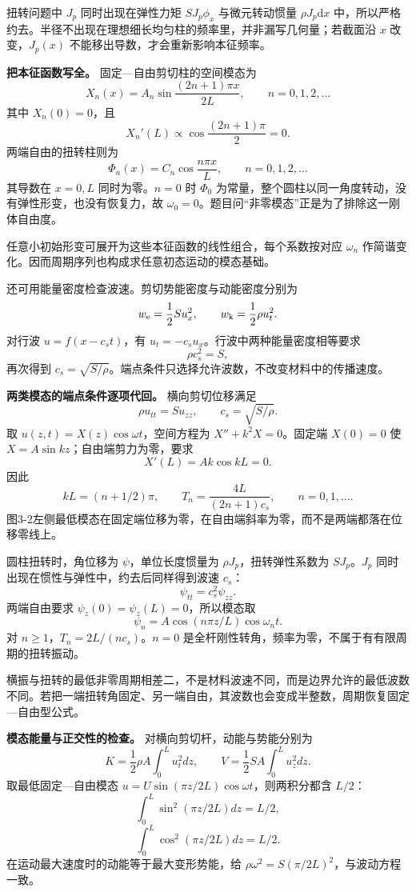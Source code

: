 \documentclass[12pt,a4paper,UTF8]{ctexart}
\begin{document}
扭转问题中 \(J_p\) 同时出现在弹性力矩 \(SJ_p\phi_x\) 与微元转动惯量
\(\rho J_p\mathrm dx\)
中，所以严格约去。半径不出现在理想细长均匀柱的频率里，并非漏写几何量；若截面沿
\(x\) 改变，\(J_p(x)\) 不能移出导数，才会重新影响本征频率。

\textbf{把本征函数写全。} 固定---自由剪切柱的空间模态为 \[
X_n(x)=A_n\sin\frac{(2n+1)\pi x}{2L},
\qquad n=0,1,2,\ldots
\] 其中 \(X_n(0)=0\)，且 \[
X_n'(L)\propto
\cos\frac{(2n+1)\pi}{2}=0.
\] 两端自由的扭转柱则为 \[
\Phi_n(x)=C_n\cos\frac{n\pi x}{L},
\qquad n=0,1,2,\ldots
\] 其导数在 \(x=0,L\) 同时为零。\(n=0\) 时 \(\Phi_0\)
为常量，整个圆柱以同一角度转动，没有弹性形变，也没有恢复力，故
\(\omega_0=0\)。题目问``非零模态''正是为了排除这一刚体自由度。

任意小初始形变可展开为这些本征函数的线性组合，每个系数按对应
\(\omega_n\) 作简谐变化。因而周期序列也构成求任意初态运动的模态基础。

还可用能量密度检查波速。剪切势能密度与动能密度分别为 \[
w_{\rm e}=\frac12S u_x^2,\qquad
w_{\rm k}=\frac12\rho u_t^2.
\] 对行波 \(u=f(x-c_st)\)，有
\(u_t=-c_su_x\)。行波中两种能量密度相等要求 \[
\rho c_s^2=S,
\] 再次得到
\(c_s=\sqrt{S/\rho}\)。端点条件只选择允许波数，不改变材料中的传播速度。

\textbf{两类模态的端点条件逐项代回。} 横向剪切位移满足 \[
\rho u_{tt}=S u_{zz},\qquad c_s=\sqrt{S/\rho}.
\] 取 \(u(z,t)=X(z)\cos\omega t\)，空间方程为 \(X''+k^2X=0\)。固定端
\(X(0)=0\) 使 \(X=A\sin kz\)；自由端剪力为零，要求 \[
X'(L)=Ak\cos kL=0.
\] 因此 \[
kL=(n+1/2)\pi,\qquad
T_n=\frac{4L}{(2n+1)c_s},\qquad n=0,1,\ldots.
\]
图3-2左侧最低模态在固定端位移为零，在自由端斜率为零，而不是两端都落在位移零线上。

圆柱扭转时，角位移为 \(\psi\)，单位长度惯量为
\(\rho J_p\)，扭转弹性系数为 \(S J_p\)。\(J_p\)
同时出现在惯性与弹性中，约去后同样得到波速 \(c_s\)： \[
\psi_{tt}=c_s^2\psi_{zz}.
\] 两端自由要求 \(\psi_z(0)=\psi_z(L)=0\)，所以模态取 \[
\psi_n=A\cos(n\pi z/L)\cos\omega_nt.
\] 对 \(n\ge1\)，\(T_n=2L/(nc_s)\)。\(n=0\)
是全杆刚性转角，频率为零，不属于有有限周期的扭转振动。

横振与扭转的最低非零周期相差二，不是材料波速不同，而是边界允许的最低波数不同。若把一端扭转角固定、另一端自由，其波数也会变成半整数，周期恢复固定---自由型公式。

\textbf{模态能量与正交性的检查。} 对横向剪切杆，动能与势能分别为 \[
K=\frac12\rho A\int_0^L u_t^2dz,
\qquad V=\frac12SA\int_0^L u_z^2dz.
\] 取最低固定---自由模态 \(u=U\sin(\pi z/2L)\cos\omega t\)，则两积分都含
\(L/2\)： \[
\int_0^L\sin^2(\pi z/2L)dz=L/2,
\] \[
\int_0^L\cos^2(\pi z/2L)dz=L/2.
\] 在运动最大速度时的动能等于最大变形势能，给
\(\rho\omega^2=S(\pi/2L)^2\)，与波动方程一致。
\end{document}
